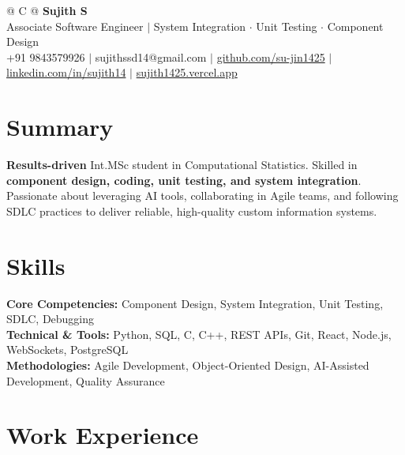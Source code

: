 \documentclass[a4paper,11pt]{article}
\newcommand{\ulink}[2]{\href{#1}{#2}}
\begin{document}
\pagestyle{empty}

\begin{tabularx}{\linewidth}{@{} C @{}}
{\color[HTML]{000000}\fontsize{30}{35}\selectfont\bfseries Sujith S} \\[5pt]
{\fontsize{10.5}{12.5}\selectfont\color[HTML]{3A3A3A}
Associate Software Engineer $|$ System Integration $\cdot$ Unit Testing $\cdot$ Component Design} \\[6pt]
{\fontsize{9.5}{11.5}\selectfont\textcolor[HTML]{3A3A3A}{+91 9843579926 $|$ sujithssd14@gmail.com $|$ \ulink{https://github.com/su-jin1425}{github.com/su-jin1425} $|$ \ulink{https://linkedin.com/in/sujith14}{linkedin.com/in/sujith14} $|$ \ulink{https://sujith1425.vercel.app}{sujith1425.vercel.app}}}
\end{tabularx}

\section{Summary}
\vspace{2pt}

{\color[HTML]{0A0A0A}\fontsize{11}{14}\selectfont
\textbf{Results-driven} Int.MSc student in Computational Statistics. Skilled in \textbf{component design, coding, unit testing, and system integration}. Passionate about leveraging AI tools, collaborating in Agile teams, and following SDLC practices to deliver reliable, high-quality custom information systems.}

\section{Skills}
\vspace{2pt}

{\color[HTML]{0A0A0A}\fontsize{11}{14}\selectfont
\textbf{Core Competencies:} Component Design, System Integration, Unit Testing, SDLC, Debugging \\[2pt]
\textbf{Technical \& Tools:} Python, SQL, C, C++, REST APIs, Git, React, Node.js, WebSockets, PostgreSQL \\[2pt]
\textbf{Methodologies:} Agile Development, Object-Oriented Design, AI-Assisted Development, Quality Assurance}

\section{Work Experience}
\vspace{2pt}
\end{document}
